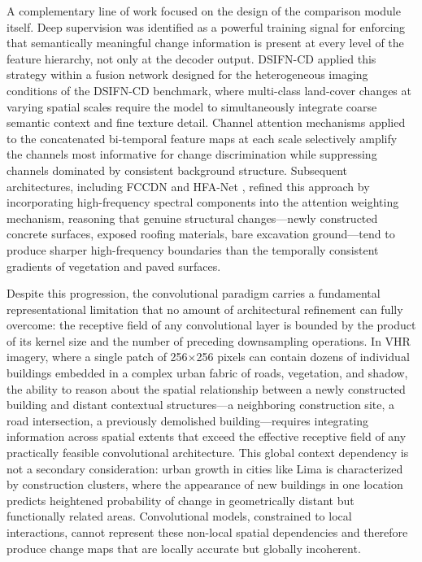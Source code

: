 A complementary line of work focused on the design of the comparison module
itself. Deep supervision was identified as a powerful training signal for
enforcing that semantically meaningful change information is present at every
level of the feature hierarchy, not only at the decoder output. DSIFN-CD
\cite{Zhang2020FusionNetDSIFN} applied this strategy within a fusion network
designed for the heterogeneous imaging conditions of the DSIFN-CD benchmark,
where multi-class land-cover changes at varying spatial scales require the
model to simultaneously integrate coarse semantic context and fine texture
detail. Channel attention mechanisms applied to the concatenated bi-temporal
feature maps at each scale selectively amplify the channels most informative
for change discrimination while suppressing channels dominated by consistent
background structure. Subsequent architectures, including
FCCDN \cite{PChen2022FCCDN} and HFA-Net \cite{Zheng2022HFANet}, refined this
approach by incorporating high-frequency spectral components into the attention
weighting mechanism, reasoning that genuine structural changes---newly
constructed concrete surfaces, exposed roofing materials, bare excavation
ground---tend to produce sharper high-frequency boundaries than the temporally
consistent gradients of vegetation and paved surfaces.

Despite this progression, the convolutional paradigm carries a fundamental
representational limitation that no amount of architectural refinement can
fully overcome: the receptive field of any convolutional layer is bounded by
the product of its kernel size and the number of preceding downsampling
operations. In VHR imagery, where a single patch of 256$\times$256 pixels can
contain dozens of individual buildings embedded in a complex urban fabric of
roads, vegetation, and shadow, the ability to reason about the spatial
relationship between a newly constructed building and distant contextual
structures---a neighboring construction site, a road intersection, a
previously demolished building---requires integrating information across
spatial extents that exceed the effective receptive field of any practically
feasible convolutional architecture. This global context dependency is not a
secondary consideration: urban growth in cities like Lima is characterized by
construction clusters, where the appearance of new buildings in one location
predicts heightened probability of change in geometrically distant but
functionally related areas. Convolutional models, constrained to local
interactions, cannot represent these non-local spatial dependencies and
therefore produce change maps that are locally accurate but globally
incoherent.

